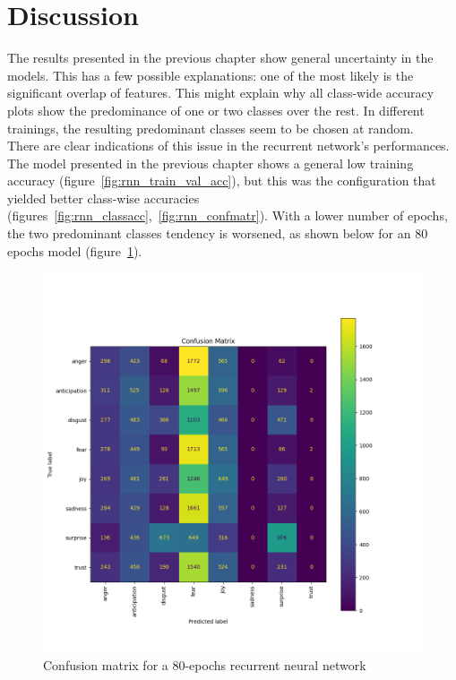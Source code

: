 \chapter*{Discussion}
\label{ch:discussion}
The results presented in the previous chapter show general
uncertainty in the models. This has a few possible explanations:
one of the most likely is the significant overlap of features. This
might explain why all class-wide accuracy plots show the predominance of one
or two classes over the rest. In different trainings, the resulting predominant
classes seem to be chosen at random.\\

There are clear indications of this issue in the recurrent network's performances.
The model presented in the previous chapter shows a general low training accuracy
(figure~\ref{fig:rnn_train_val_acc}), but this was the configuration that
yielded better class-wise accuracies (figures~\ref{fig:rnn_classacc},~\ref{fig:rnn_confmatr}).
With a lower number of epochs, the two predominant classes tendency is worsened, as shown below for an
80 epochs model (figure~\ref{fig:rnn_confmatr80}).
\begin{figure}[H]
    \centering
    \includegraphics[scale= 0.4]{pictures/rnn_confusion_matrix_80_epochs.png}
    \caption{Confusion matrix for a 80-epochs recurrent neural network}
    \label{fig:rnn_confmatr80}
\end{figure}
